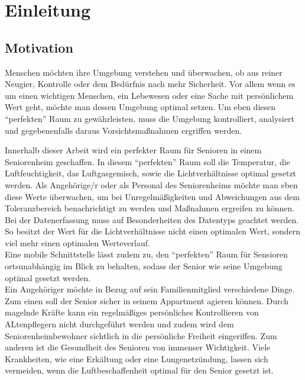 \chapter{Einleitung}

\section{Motivation}
Menschen möchten ihre Umgebung verstehen und überwachen, ob aus reiner Neugier, Kontrolle oder dem Bedürfnis nach mehr Sicherheit. Vor allem wenn es um einen wichtigen Menschen, ein Lebewesen oder eine Sache mit persönlichem Wert geht, möchte man dessen Umgebung optimal setzen. Um eben diesen ``perfekten'' Raum zu gewährleisten, muss die Umgebung kontrolliert, analysiert und gegebenenfalls daraus Vorsichtsmaßnahmen ergriffen werden.

Innerhalb dieser Arbeit wird ein perfekter Raum für Senioren in einem Seniorenheim geschaffen. In diesem ``perfekten'' Raum soll die Temperatur, die Luftfeuchtigkeit, das Luftgasgemisch, sowie die Lichtverhältnisse optimal gesetzt werden. Als Angehörige/r oder als Personal des Seniorenheims möchte man eben diese Werte überwachen, um bei Unregelmäßigkeiten und Abweichungen aus dem Toleranzbereich benachrichtigt zu werden und Maßnahmen ergreifen zu können. Bei der Datenerfassung muss auf Besonderheiten des Datentyps geachtet werden. So besitzt der Wert für die Lichtverhältnisse nicht einen optimalen Wert, sondern viel mehr einen optimalen Werteverlauf.\\
Eine mobile Schnittstelle lässt zudem zu, den ``perfekten'' Raum für Sensioren ortsunabhängig im Blick zu behalten, sodass der Senior wie seine Umgebung optimal gesetzt werden.\\
Ein Angehöriger möchte in Bezug auf sein Familienmitglied verschiedene Dinge. Zum einen soll der Senior sicher in seinem Appartment agieren können. Durch magelnde Kräfte kann ein regelmäßiges persönliches Kontrollieren von ALtenpflegern nicht durchgeführt werden und zudem wird dem Seniorenheimbewohner sichtlich in die persönliche Freiheit eingeriffen. Zum anderen ist die Gesundheit des Senioren von immenser Wichtigkeit. Viele Krankheiten, wie eine Erkältung oder eine Lungenetzündung, lassen sich vermeiden, wenn die Luftbeschaffenheit optimal für den Senior gesetzt ist. 


